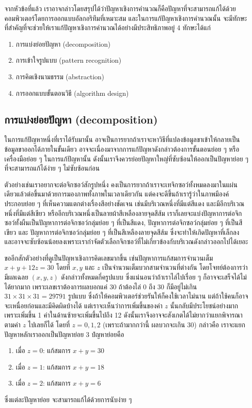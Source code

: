 จากหัวข้อที่แล้ว เราอาจกล่าวโดยสรุปได้ว่าปัญหาเชิงการคำนวณก็คือปัญหาที่จะสามารถแก้ได้ด้วยคอมพิวเตอร์โดยการออกแบบอัลกอริทึมที่เหมาะสม และในการแก้ปัญหาเชิงการคำนวณนั้น จะมีทักษะที่สำคัญที่จะช่วยให้เราแก้ปัญหาเชิงการคำนวณได้อย่างมีประสิทธิภาพอยู่ 4 ทักษะได้แก่
\begin{enumerate}
	\itemsep0em 
	\item การแบ่งย่อยปัญหา (decomposition)
	\item การเข้าใจรูปแบบ (pattern recognition)
	\item การคิดเชิงนามธรรม (abstraction)
	\item การออกแบบขั้นตอนวิธี (algorithm design)
\end{enumerate}

\subsection{การแบ่งย่อยปัญหา (decomposition)}
ในการแก้ปัญหาหนึ่งที่เราได้รับมานั้น อาจเป็นการยากถ้าเราจะหาวิธีที่แปลงข้อมูลขาเข้าให้กลายเป็นข้อมูลขาออกได้ภายในขั้นเดียว อาจจะเนื่องมาจากการแก้ปัญหาดังกล่าวต้องการขั้นตอนย่อย ๆ หรือเครื่องมือย่อย ๆ ในการแก้ปัญหานั้น ดังนั้นเราจึงควรย่อยปัญหาใหญ่ที่ซับซ้อนให้ออกเป็นปัญหาย่อย ๆ ที่จะสามารถแก้ได้ง่าย ๆ ไม่ซับซ้อนก่อน

ตัวอย่างเช่นเราอยากจะต่อจิกซอว์สักรูปหนึ่ง คงเป็นการยากถ้าเราจะเทจิกซอว์ทั้งหมดลงมาในแผ่นเดียวแล้วต่อขึ้นมาด้วยการมองภาพทั้งภาพในเวลาเดียวกัน แต่คงจะดีขึ้นถ้าเรารู้ว่าในภาพมีองค์ประกอบย่อย ๆ ที่เห็นความแตกต่างเรื่องสีอย่างชัดเจน เช่นมีบริเวณหนึ่งที่มีแต่สีแดง และมีอีกบริเวณหนึ่งที่มีแต่สีเขียว หรืออีกบริเวณหนึ่งเป็นลายผ้าสีเหลืองลายจุดสีส้ม เราก็เลยจะแบ่งปัญหาการต่อจิกซอว์ทั้งผืนเป็นปัญหาการต่อจิกซอว์กลุ่มย่อย ๆ ที่เป็นสีแดง, ปัญหาการต่อจิกซอว์กลุ่มย่อย ๆ ที่เป็นสีเขียว และ ปัญหาการต่อจิกซอว์กลุ่มย่อย ๆ ที่เป็นสีเหลืองลายจุดสีส้ม ซึ่งจะทำให้เกิดปัญหาที่เล็กลงและอาจจะซับซ้อนน้อยลงเพราะเรากำจัดตัวเลือกจิกซอว์ที่ไม่เกี่ยวข้องกับบริเวณดังกล่าวออกไปได้เยอะ

ขออีกสักตัวอย่างที่ดูเป็นปัญหาเชิงการคิดเลขมากขึ้น เช่นปัญหาการแก้สมการจำนวนเต็ม $x + y + 12z = 30$ โดยที่ $x, y$ และ $z$ เป็นจำนวนเต็มบวกสามจำนวนที่ต่างกัน โดยโจทย์ต้องการว่ามีผลเฉลย $(x,y,z)$ ดังกล่าวทั้งหมดกี่ครูปแบบ ซึ่งแน่นอนว่าถ้าเราไล่ไปเรื่อย ๆ ก็อาจจะเสร็จได้ไม่ได้ยากมาก เพราะเลขเราต้องการผลบอกแค่ 30 ถ้าต้องไล่ 0 ถึง 30 ก็มีอยู่ไม่เกิน $31 \times 31 \times 31 = 29791$ รูปแบบ ซึ่งถ้าให้คอมพิวเตอร์ช่วยรันให้ก็คงใช้เวลาไม่นาน แต่ถ้าใช้คนก็อาจจะเหนื่อยก่อนและมีคิดผิดบ้างได้ แต่เราจะเห็นว่าการเพิ่มขึ้นของค่า $z$ นั้นกลับมีประโยชน์อย่างมาก เพราะเพิ่มขึ้น 1 ค่าในด้านซ้ายจะเพิ่มขึ้นไปถึง 12 ดังนั้นเราจึงอาจจะสังเกตได้ไม่ยากว่าแยกพิจารณาตามค่า $z$ ไปเลยก็ได้ โดยที่ $z = 0,1,2$ (เพราะถ้ามากกว่านี้ ผลบวกจะเกิน 30) กล่าวคือ เราจะแยกปัญหาหลักเราออกเป็นปัญหาย่อย 3 ปํญหาย่อยคือ
\begin{enumerate}
	\itemsep0em 
	\item เมื่อ $z = 0$: แก้สมการ $x + y = 30$
	\item เมื่อ $z = 1$: แก้สมการ $x + y = 18$
	\item เมื่อ $z = 2$: แก้สมการ $x + y = 6$
\end{enumerate}
ซึ่งแต่ละปัญหาย่อย จะสามารถแก้ได้ด้วยการนับง่าย ๆ

